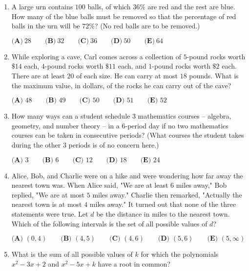 \documentclass{article}
\begin{document}
\begin{enumerate}[label=\arabic*., itemsep=0.5em]\item A large urn contains \(100\) balls, of which \(36 \%\) are red and the rest are blue. How many of the blue balls must be removed so that the percentage of red balls in the urn will be \(72 \%\)? (No red balls are to be removed.)

\( \textbf{(A)}\ 28 \qquad\textbf{(B)}\  32 \qquad\textbf{(C)}\  36 \qquad\textbf{(D)}\ 
 50 \qquad\textbf{(E)}\ 64 \)\par \vspace{0.5em}\item While exploring a cave, Carl comes across a collection of \(5\)-pound rocks worth \(\$14\) each, \(4\)-pound rocks worth \(\$11\) each, and \(1\)-pound rocks worth \(\$2\) each. There are at least \(20\) of each size. He can carry at most \(18\) pounds. What is the maximum value, in dollars, of the rocks he can carry out of the cave?

\(\textbf{(A) } 48 \qquad \textbf{(B) } 49 \qquad \textbf{(C) } 50 \qquad \textbf{(D) } 51 \qquad \textbf{(E) } 52 \)\par \vspace{0.5em}\item How many ways can a student schedule \(3\) mathematics courses -- algebra, geometry, and number theory -- in a \(6\)-period day if no two mathematics courses can be taken in consecutive periods? (What courses the student takes during the other \(3\) periods is of no concern here.)

\(\textbf{(A) }3\qquad\textbf{(B) }6\qquad\textbf{(C) }12\qquad\textbf{(D) }18\qquad\textbf{(E) }24\)\par \vspace{0.5em}\item Alice, Bob, and Charlie were on a hike and were wondering how far away the nearest town was. When Alice said, "We are at least \(6\) miles away," Bob replied, "We are at most \(5\) miles away." Charlie then remarked, "Actually the nearest town is at most \(4\) miles away." It turned out that none of the three statements were true. Let \(d\) be the distance in miles to the nearest town. Which of the following intervals is the set of all possible values of \(d\)?

\(\textbf{(A) }   (0,4)   \qquad        \textbf{(B) }   (4,5)   \qquad    \textbf{(C) }   (4,6)   \qquad   \textbf{(D) }  (5,6)  \qquad  \textbf{(E) }   (5,\infty) \)\par \vspace{0.5em}\item What is the sum of all possible values of \(k\) for which the polynomials \(x^2 - 3x + 2\) and \(x^2 - 5x + k\) have a root in common?


\end{enumerate}
\end{document}
